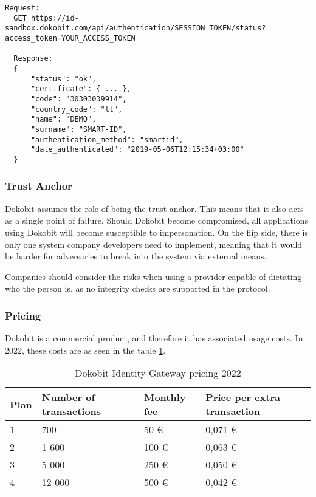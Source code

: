 \begin{lstlisting}[caption={Handling Dokobit session creation}, label={lst:dokobit-handleremote-http}]
  Request:
  GET https://id-sandbox.dokobit.com/api/authentication/SESSION_TOKEN/status?access_token=YOUR_ACCESS_TOKEN
  
  Response:
  {
      "status": "ok",
      "certificate": { ... },
      "code": "30303039914",
      "country_code": "lt",
      "name": "DEMO",
      "surname": "SMART-ID",
      "authentication_method": "smartid",
      "date_authenticated": "2019-05-06T12:15:34+03:00"
  }
\end{lstlisting}

\subsubsection{Trust Anchor}

Dokobit assumes the role of being the trust anchor. This means that it also acts as a single point of failure. Should Dokobit become compromised, all applications using Dokobit will become susceptible to impersonation. On the flip side, there is only one system company developers need to implement, meaning that it would be harder for adversaries to break into the system via external means.

Companies should consider the risks when using a provider capable of dictating who the person is, as no integrity checks are supported in the protocol.

\subsubsection{Pricing}

Dokobit is a commercial product, and therefore it has associated usage costs. In 2022, these costs are as seen in the table \ref{tab:dokobit-pricing}.

\begin{table}[h]
  \centering
  \caption{Dokobit Identity Gateway pricing 2022}
  \begin{tabular}{| l | l | l | l |}
    \hline
    \bf{Plan} & \bf{Number of transactions} & \bf{Monthly fee} & \bf{Price per extra transaction} \\
    \hline
    1         & 700                         & 50 €             & 0,071 €                          \\
    \hline
    2         & 1 600                       & 100 €            & 0,063 €                          \\
    \hline
    3         & 5 000                       & 250 €            & 0,050 €                          \\
    \hline
    4         & 12 000                      & 500 €            & 0,042 €                          \\
    \hline
  \end{tabular}
  \label{tab:dokobit-pricing}
\end{table}

